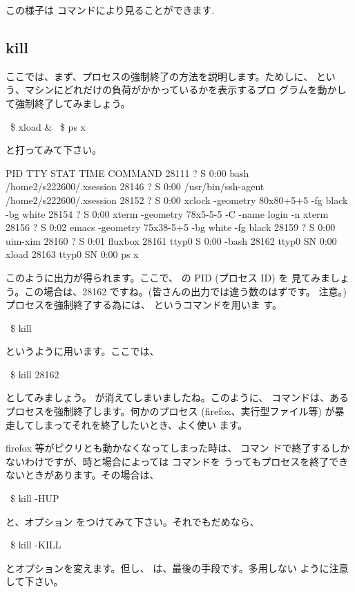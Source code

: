 \documentclass[platex]{jsarticle}
\begin{document}
  この様子は  コマンドにより見ることができます.


  \subsection{kill}
  ここでは、まず、プロセスの強制終了の方法を説明します。ためしに、
   という、マシンにどれだけの負荷がかかっているかを表示するプロ
  グラムを動かして強制終了してみましょう。
  \begin{terminal}%
~\$ xload &
~\$ ps x\end{terminal}
  と打ってみて下さい。
  \begin{terminal}\strut%
  PID TTY      STAT  TIME COMMAND
28111 ?        S     0:00 bash /home2/s222600/.xsession
28146 ?        S     0:00 /usr/bin/ssh-agent /home2/s222600/.xsession
28152 ?        S     0:00 xclock -geometry 80x80+5+5 -fg black -bg white
28154 ?        S     0:00 xterm -geometry 78x5-5-5 -C -name login -n xterm
28156 ?        S     0:02 emacs -geometry 75x38-5+5 -bg white -fg black
28159 ?        S     0:00 uim-xim
28160 ?        S     0:01 fluxbox
28161 ttyp0    S     0:00 -bash
28162 ttyp0    SN    0:00 xload
28163 ttyp0    SN    0:00 ps x\end{terminal}
  このように出力が得られます。ここで、 の PID (プロセス ID) を
  見てみましょう。この場合は、28162 ですね。(皆さんの出力では違う数のはずです。
  注意。) プロセスを強制終了する為には、 というコマンドを用いま
  す。
  \begin{terminal}~\$ kill \end{terminal}
  というように用います。ここでは、
  \begin{terminal}~\$ kill 28162\end{terminal}
  としてみましょう。 が消えてしまいましたね。このように、
   コマンドは、あるプロセスを強制終了します。何かのプロセス
  (firefox、実行型ファイル等) が暴走してしまってそれを終了したいとき、よく使い
  ます。

  firefox 等がピクリとも動かなくなってしまった時は、 コマン
  ドで終了するしかないわけですが、時と場合によっては  コマンドを
  うってもプロセスを終了できないときがあります。その場合は、
  \begin{terminal}~\$ kill -HUP \end{terminal}
  と、オプション  をつけてみて下さい。それでもだめなら、
  \begin{terminal}~\$ kill -KILL \end{terminal}
  とオプションを変えます。但し、 は、最後の手段です。多用しない
  ように注意して下さい。
\end{document}
